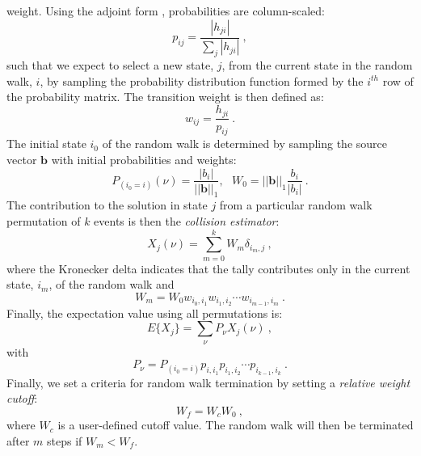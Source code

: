 \documentclass{snamc2013}
\begin{document}
weight. Using the adjoint form \cite{spanier_monte_1969},
probabilities are column-scaled:
\begin{equation}
  p_{ij} = \frac{|h_{ji}|}{\sum_j |h_{ji}|}\:,
  \label{eq:adjoint_probability}
\end{equation}
such that we expect to select a new state, $j$, from the current state
in the random walk, $i$, by sampling the probability distribution
function formed by the $i^{th}$ row of the probability matrix. The
transition weight is then defined as:
\begin{equation}
  w_{ij} = \frac{h_{ji}}{p_{ij}}\:.
  \label{eq:adjoint_weight}
\end{equation}
The initial state $i_0$ of the random walk is determined by sampling
the source vector $\mathbf{b}$ with initial probabilities and weights:
\begin{equation}
  P_{(i_0=i)}(\nu) = \frac{|b_i|}{||\mathbf{b}||_1},\ \ \ W_0 =
  ||\mathbf{b}||_1 \frac{b_i}{|b_i|}\:.
  \label{eq:adjoint_starting_params}
\end{equation}
The contribution to the solution in state $j$ from a particular random
walk permutation of $k$ events is then the \textit{collision
  estimator}:
\begin{equation}
  X_{j}(\nu) = \sum_{m=0}^k W_{m} \delta_{i_m,j}\:,
  \label{eq:adjoint_permutation_contribution}
\end{equation}
where the Kronecker delta indicates that the tally contributes only in
the current state, $i_m$, of the random walk and 
\begin{equation}
  W_{m} = W_0 w_{i_0,i_1} w_{i_1,i_2} \cdots w_{i_{m-1},i_m}\:.
  \label{eq:adjoint_permutation_weight}
\end{equation}
Finally, the expectation value using all permutations is:
\begin{equation}
  E\{X_j\} = \sum_{\nu} P_{\nu} X_{j}(\nu)\:,
  \label{eq:adjoint_expectation_value}
\end{equation}
with
\begin{equation}
  P_{\nu} = P_{(i_0=i)} p_{i,i_1} p_{i_1,i_2} \cdots p_{i_{k-1},i_k}\:.
  \label{eq:adjoint_permutation_probability}
\end{equation}
Finally, we set a criteria for random walk termination by setting a
\textit{relative weight cutoff}:
\begin{equation}
  W_f = W_c W_0\:,
  \label{eq:relative_weight_cutoff}
\end{equation}
where $W_c$ is a user-defined cutoff value. The random walk will then
be terminated after $m$ steps if $W_m < W_f$.
\end{document}
